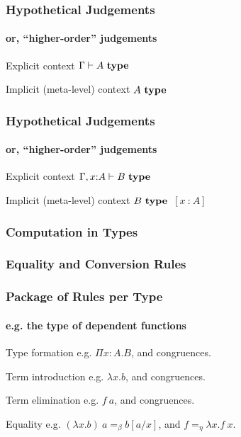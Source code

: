 \documentclass[mathserif]{beamer}
\newcommand{\istype}[1]{\ensuremath{#1 ~\textbf{\textrm{type}}}}
\newcommand{\isterm}[2]{\ensuremath{#1 ~\textbf{{:}}~ #2}}
\newcommand{\hyp}[1]{\ensuremath{~[\isterm{x}{#1}]}}
\newcommand{\Funv}[3]{\ensuremath{\Pi #1{:}#2. #3}}
\newcommand{\Fun}[2]{\Funv{x}{#1}{#2}}
\newcommand{\funv}[2]{\ensuremath{\lambda #1. #2}}
\newcommand{\fun}[1]{\funv{x}{#1}}
\newcommand{\app}[2]{\ensuremath{#1~#2}}
\newcommand{\sub}[2]{\ensuremath{#1[#2/x]}}
\begin{document}
\begin{frame}
\frametitle{Hypothetical Judgements}
\framesubtitle{or, ``higher-order'' judgements}

\begin{block}{Explicit context}
$\Gamma \vdash \istype{A}$
\end{block}

\begin{block}{Implicit (meta-level) context}
\istype{A}
\end{block}

\end{frame}

\begin{frame}
\frametitle{Hypothetical Judgements}
\framesubtitle{or, ``higher-order'' judgements}

\begin{block}{Explicit context}
$\Gamma, x{:}A \vdash \istype{B}$
\end{block}

\begin{block}{Implicit (meta-level) context}
\istype{B} \hyp{A}
\end{block}

\end{frame}

\begin{frame}
\frametitle{Computation in Types}


\end{frame}

\begin{frame}
\frametitle{Equality and Conversion Rules}

\end{frame}


\begin{frame}
\frametitle{Package of Rules per Type}
\framesubtitle{e.g. the type of dependent functions}

\begin{block}{Type formation}
e.g. \Fun{A}{B}, and congruences.
\end{block}

\begin{block}{Term introduction}
e.g. \fun{b}, and congruences.
\end{block}

\begin{block}{Term elimination}
e.g. \app{f}{a}, and congruences.
\end{block}

\begin{block}{Equality}
  e.g. $\app{(\fun{b})}{a} =_\beta \sub{b}{a}$, and
  $f =_\eta \fun{\app{f}{x}}$.
\end{block}

\end{frame}
\end{document}
